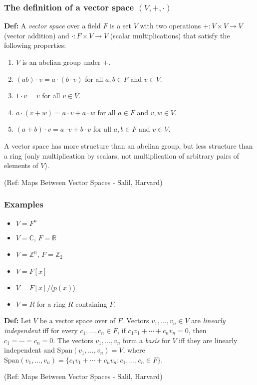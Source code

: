 \begin{frame}[fragile]
\frametitle{The definition of a vector space $(V, +, \cdot)$}
\textbf{Def:} A {\em vector space} over a field $F$ is a set $V$ with two operations $+ : V\times V\rightarrow V$ (vector addition) and $\cdot : F\times V\rightarrow V$ (scalar multiplications) that satisfy the following properties:

\begin{enumerate}
\item $V$ is an abelian group under $+$.
\item $(ab)\cdot v = a\cdot (b\cdot v)$ for all $a,b\in F$ and $v\in V$.
\item $1\cdot v=v$ for all $v\in V$.
\item $a\cdot (v+w) = a\cdot v+a\cdot w$ for all $a\in F$ and $v,w\in V$.
\item $(a+b)\cdot v = a\cdot v+b\cdot v$ for all $a,b\in F$ and $v\in V$.
\end{enumerate}

A vector space has more structure than an abelian group, but less structure than a ring (only multiplication by scalars, not multiplication of arbitrary pairs of elements of $V$).


\tiny{(Ref: Maps Between Vector Spaces - Salil, Harvard)}
\end{frame}


\begin{frame}[fragile]
\frametitle{Examples}

\begin{itemize}
\item $V=F^n$ \vspace{5ex}
\item $V={\mathbb C}$, $F={\mathbb R}$ \vspace{5ex}
\item $V={\mathbb Z}^n$, $F={\mathbb Z}_2$ \vspace{5ex}
\item $V=F[x]$ \vspace{5ex}
\item $V=F[x]/\langle p(x)\rangle$ \vspace{5ex}
\item $V=R$ for a ring $R$ containing $F$.
\end{itemize}

\textbf{Def:} Let $V$ be a vector space over of $F$.  Vectors $v_1,\ldots,v_n\in V$ are {\em linearly independent} iff for every $c_1,\ldots,c_n\in F$, if $c_1v_1+\cdots+c_nv_n=0$, then $c_1=\cdots=c_n=0$.  The vectors $v_1,\ldots,v_n$ form a {\em basis} for $V$ iff they are linearly independent and $\mathrm{Span}(v_1,\ldots,v_n)=V$, where $\mathrm{Span}(v_1,\ldots,v_n) = \{c_1v_1+\cdots+c_nv_n : c_1,\ldots,c_n\in F\}$.


\tiny{(Ref: Maps Between Vector Spaces - Salil, Harvard)}
\end{frame}

